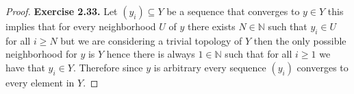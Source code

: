 \documentclass[11pt]{article}
\newcommand{\N}{\mathbb{N}}
\theoremstyle{definition}
\begin{document}
\cleardoublepage
\begin{proof}{\textbf{Exercise 2.33.}}
    Let $(y_i) \subseteq Y$ be a sequence that converges to $y \in Y$
    this implies that for every
    neighborhood $U$ of $y$ there exists $N \in \N$ such that $y_i \in U$ for
    all $i \geq N$ but we are considering a trivial topology of $Y$
    then the only possible neighborhood for $y$ is $Y$ hence there is always
    $1 \in \N$ such that for all $i \geq 1$ we have that $y_i \in Y$.
    Therefore since $y$ is arbitrary every sequence $(y_i)$ converges to every
    element in $Y$.
\end{proof}
\end{document}
